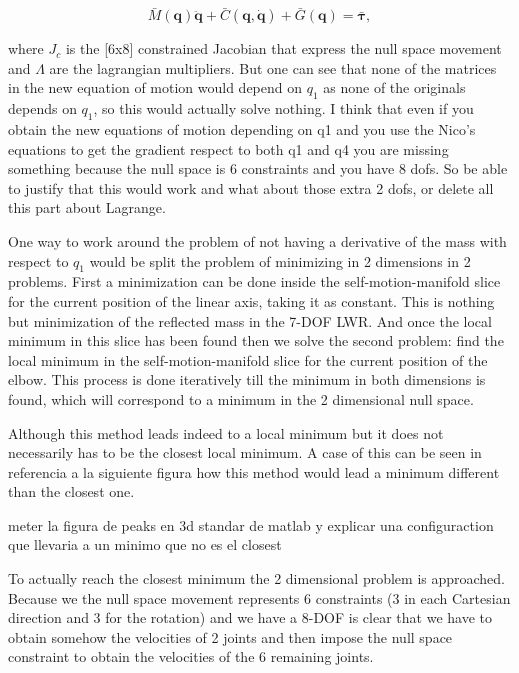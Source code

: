 \begin{equation}
\bar{M}(\mathbf{q})\ddot{\mathbf{q}}+\bar{C}(\mathbf{q},\dot{\mathbf{q}})+\bar{G}(\mathbf{q})=\bar{\mathbf{\tau}},
\label{new_joint_space_dynamics}
\end{equation}	

where $J_c$ is the [6x8] constrained Jacobian that express the null space movement and $\Lambda$ are the lagrangian multipliers. But one can see that none of the matrices in the new equation of motion would depend on $q_1$ as none of the originals depends on $q_1$, so this would actually solve nothing. {\color{red} I think that even if you obtain the new equations of motion depending on q1 and you use the Nico's equations to get the gradient respect to both q1 and q4 you are missing something because the null space is 6 constraints and you have 8 dofs. So be able to justify that this would work and what about those extra 2 dofs, or delete all this part about Lagrange.}

One way to work around the problem of not having a derivative of the mass with respect to $q_1$ would be split the problem of minimizing in 2 dimensions in 2 problems. First a minimization can be done inside the self-motion-manifold slice for the current position of the linear axis, taking it as constant. This is nothing but minimization of the reflected mass in the 7-DOF LWR. And once the local minimum in this slice has been found then we solve the second problem: find the local minimum in the self-motion-manifold slice for the current position of the elbow. This process is done iteratively till the minimum in both dimensions is found, which will correspond to a minimum in the 2 dimensional null space.

Although this method leads indeed to a local minimum but it does not necessarily has to be the closest local minimum. A case of this can be seen in {\color{red} referencia a la siguiente figura}  how this method would lead a minimum different than the closest one. 

 {\color{red} meter la figura de peaks en 3d standar de matlab y explicar una configuraction que llevaria a un minimo que no es el closest}

To actually reach the closest minimum the 2 dimensional problem is approached. Because we the null space movement represents 6 constraints (3 in each Cartesian direction and 3 for the rotation) and we have a 8-DOF is clear that we have to obtain somehow the velocities of 2 joints and then impose the null space constraint to obtain the velocities of the 6 remaining joints.

